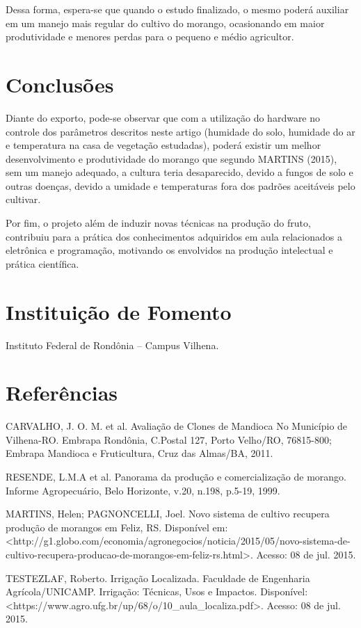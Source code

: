 \documentclass[article,12pt,onesidea,4paper,english,brazil]{abntex2}
\begin{document}
	Dessa forma, espera-se que quando o estudo finalizado, o mesmo poderá auxiliar em um manejo mais regular do cultivo do morango, ocasionando em maior produtividade e menores perdas para o pequeno e médio agricultor.
	
	\section*{Conclusões}
	
Diante do exporto, pode-se observar que com a utilização do hardware no controle dos parâmetros descritos neste artigo (humidade do solo, humidade do ar e temperatura na casa de vegetação estudadas), poderá existir um melhor desenvolvimento e produtividade do morango que segundo MARTINS (2015), sem um manejo adequado, a cultura teria desaparecido, devido a fungos de solo e outras doenças, devido a umidade e temperaturas fora dos padrões aceitáveis pelo cultivar.

Por fim, o projeto além de induzir novas técnicas na produção do fruto, contribuiu para a prática dos conhecimentos adquiridos em aula relacionados a eletrônica e programação, motivando os envolvidos na produção intelectual e prática científica.
	
	\section*{Instituição de Fomento}
	
	Instituto Federal de Rondônia – Campus Vilhena.
	
	\section*{Referências}
	
	\sloppy
	
	\noindent CARVALHO, J. O. M. et al. Avaliação de Clones de Mandioca No Município de Vilhena-RO. Embrapa Rondônia, C.Postal 127, Porto Velho/RO, 76815-800; Embrapa Mandioca e Fruticultura, Cruz das Almas/BA, 2011.
	
	\noindent RESENDE, L.M.A et al. Panorama da produção e comercialização de morango. Informe Agropecuário, Belo Horizonte, v.20, n.198, p.5-19, 1999.
	
	\noindent MARTINS, Helen; PAGNONCELLI, Joel. Novo sistema de cultivo recupera produção de morangos em Feliz, RS. Disponível em:
	<http://g1.globo.com/economia/agronegocios/noticia/2015/05/novo-sistema-de- cultivo-recupera-producao-de-morangos-em-feliz-rs.html>. Acesso: 08 de jul. 2015.
	
	\noindent TESTEZLAF, Roberto. Irrigação Localizada. Faculdade de Engenharia Agrícola/UNICAMP. Irrigação: Técnicas, Usos e Impactos. Disponível:
	<https://www.agro.ufg.br/up/68/o/10\_aula\_localiza.pdf>. Acesso: 08 de jul. 2015.
	
	
\end{document}
